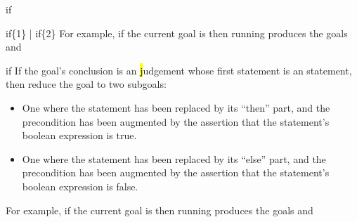 \begin{tactic}{if}
\begin{tsyntax}{if\{1\} | if\{2\}}
    For example, if the current goal is
     then running
     produces the
    goals  and
  \end{tsyntax}

  \begin{tsyntax}{if}
    If the goal's conclusion is an \hl judgement whose first statement
    is an  statement, then reduce the goal to two subgoals:
    \begin{itemize}
    \item One where the  statement has been replaced by its
      ``then'' part, and the precondition has been augmented by the
      assertion that the  statement's boolean expression is true.

    \item One where the  statement has been replaced by its
      ``else'' part, and the precondition has been augmented by the
      assertion that the  statement's boolean expression is false.
    \end{itemize}

    For example, if the current goal is
     then running
     produces the
    goals  and
  \end{tsyntax}
\end{tactic}
